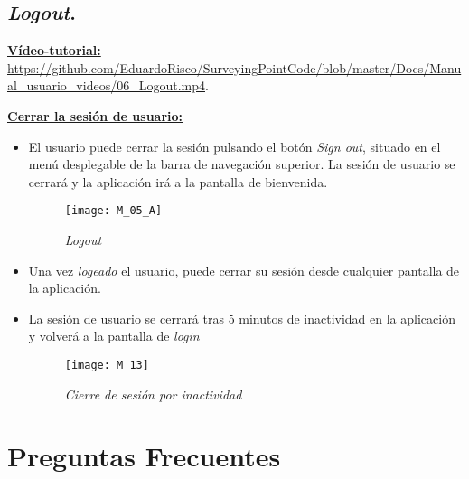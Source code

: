 \subsection{\emph{Logout}.}

\textbf{\underline{Vídeo-tutorial:}}
\url{https://github.com/EduardoRisco/SurveyingPointCode/blob/master/Docs/Manual_usuario_videos/06_Logout.mp4}.

\textbf{\underline{Cerrar la sesión de usuario:} }

\begin{itemize}

\item El usuario puede cerrar la sesión pulsando el botón \emph{Sign out}, situado en el menú desplegable de la barra de navegación superior. La sesión de usuario se cerrará y la aplicación irá a la pantalla de bienvenida.

\begin{figure}[H]
	\centering
	\texttt{[image: M\_05\_A]}
	\caption{\emph{Logout}}
	\label{fig:M_05_A}
\end{figure}

\item Una vez \emph{logeado} el usuario, puede cerrar su sesión desde cualquier pantalla de la aplicación.

\item La sesión de usuario se cerrará tras 5 minutos de inactividad en la aplicación y volverá a la pantalla de \emph{login}
\begin{figure}[H]
	\centering
	\texttt{[image: M\_13]}
	\caption{\emph{Cierre de sesión por inactividad}}
	\label{fig:M_13}
\end{figure}

\end{itemize}

\section{Preguntas Frecuentes}

